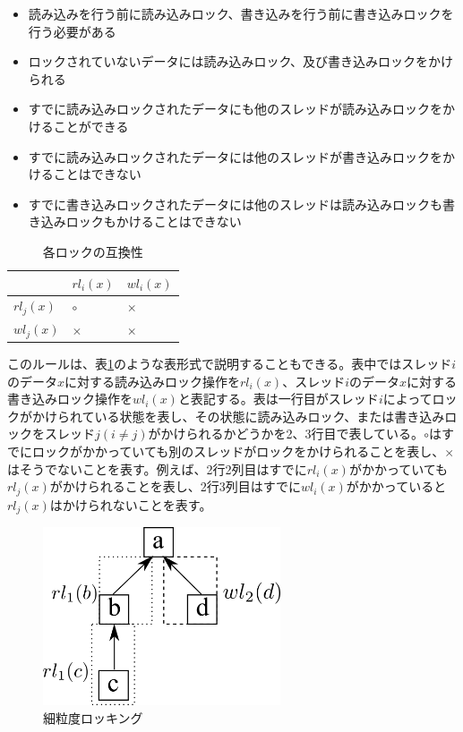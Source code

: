 \documentclass[a4paper]{jreport}	%
\begin{document}
\begin{itemize}
 \item 読み込みを行う前に読み込みロック、書き込みを行う前に書き込みロックを行う必要がある
 \item ロックされていないデータには読み込みロック、及び書き込みロックをかけられる
 \item すでに読み込みロックされたデータにも他のスレッドが読み込みロックをかけることができる
 \item すでに読み込みロックされたデータには他のスレッドが書き込みロックをかけることはできない
 \item すでに書き込みロックされたデータには他のスレッドは読み込みロックも書き込みロックもかけることはできない
\end{itemize}


\begin{table}[h!]
\centering
\begin{tabular}{ | m{1cm} | m{1cm} | m{1cm} | } 
  \hline
  & $rl_i(x)$ & $wl_i(x)$ \\ 
  \hline
  $rl_j(x)$ & $\circ$ & $\times$ \\ 
  \hline
  $wl_j(x)$ &  $\times$ & $\times$ \\ 
  \hline
\end{tabular}	
\caption{各ロックの互換性}
\label{table:lock-table}
\end{table}


このルールは、表\ref{table:lock-table}のような表形式で説明することもできる。表中ではスレッド$i$のデータ$x$に対する読み込みロック操作を$rl_i(x)$、スレッド$i$のデータ$x$に対する書き込みロック操作を$wl_i(x)$と表記する。表は一行目がスレッド$i$によってロックがかけられている状態を表し、その状態に読み込みロック、または書き込みロックをスレッド$j(i \neq j)$がかけられるかどうかを2、3行目で表している。$\circ$はすでにロックがかかっていても別のスレッドがロックをかけられることを表し、$\times$はそうでないことを表す。例えば、2行2列目はすでに$rl_i(x)$がかかっていても$rl_j(x)$がかけられることを表し、2行3列目はすでに$wl_i(x)$がかかっていると$rl_j(x)$はかけられないことを表す。

\begin{figure}[h] 
\centering
\includegraphics[width=7cm]{high-gran-lock}
\caption{細粒度ロッキング}
\label{fig:high-gran-lock}
\end{figure}
\end{document}
